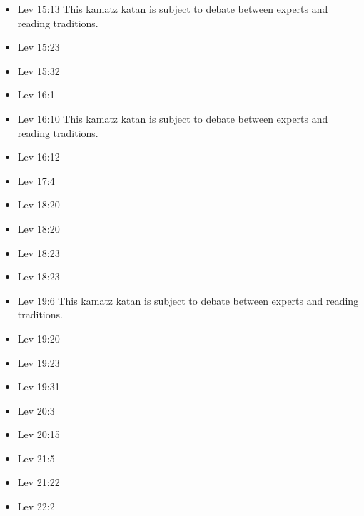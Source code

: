 \documentclass[14pt]{article}
\begin{document}
\begin{multicols}{2}
\begin{itemize}
\item Lev 15:13 This kamatz katan is subject to debate between experts and reading traditions.


\item Lev 15:23

\item Lev 15:32

\item Lev 16:1

\item Lev 16:10 This kamatz katan is subject to debate between experts and reading traditions.

\item Lev 16:12

\item Lev 17:4

\item Lev 18:20

\item Lev 18:20

\item Lev 18:23

\item Lev 18:23

\item Lev 19:6 This kamatz katan is subject to debate between experts and reading traditions.

\item Lev 19:20

\item Lev 19:23

\item Lev 19:31

\item Lev 20:3

\item Lev 20:15

\item Lev 21:5

\item Lev 21:22

\item Lev 22:2


\end{itemize}
\end{multicols}
\end{document}
